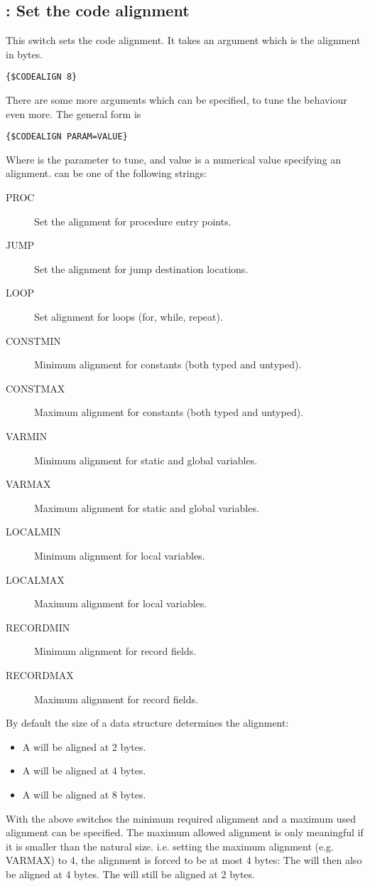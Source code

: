 \subsection{ : Set the code alignment}
This switch sets the code alignment. It takes an argument which is the alignment in bytes.
\begin{verbatim}
{$CODEALIGN 8}
\end{verbatim}
There are some more arguments which can be specified, to tune the behaviour
even more. The general form is
\begin{verbatim}
{$CODEALIGN PARAM=VALUE}
\end{verbatim}
Where  is the parameter to tune, and  value is a
numerical value specifying an alignment.  can be one of the
following strings:
\begin{description}
\item[PROC] Set the alignment for procedure entry points.
\item[JUMP] Set the alignment for jump destination locations.
\item[LOOP] Set alignment for loops (for, while, repeat).
\item[CONSTMIN] Minimum alignment for constants (both typed and untyped).
\item[CONSTMAX] Maximum alignment for constants (both typed and untyped).
\item[VARMIN] Minimum alignment for static and global variables.
\item[VARMAX] Maximum alignment for static and global variables.
\item[LOCALMIN] Minimum alignment for local variables.
\item[LOCALMAX] Maximum alignment for local variables.
\item[RECORDMIN] Minimum alignment for record fields.
\item[RECORDMAX] Maximum alignment for record fields.
\end{description}
By default the size of a data structure determines the alignment:
\begin{itemize}
\item A  will be aligned at 2 bytes.
\item A  will be aligned at 4 bytes.
\item A  will be aligned at 8 bytes. 
\end{itemize}
With the above switches the minimum required alignment and a maximum 
used alignment can be specified. The maximum allowed alignment is only
meaningful if it is smaller than the natural size. i.e. setting the 
maximum alignment (e.g. VARMAX) to 4, the alignment is forced to
be at most 4 bytes: The  will then also be aligned at 
4 bytes. The  will still be aligned at 2 bytes.

